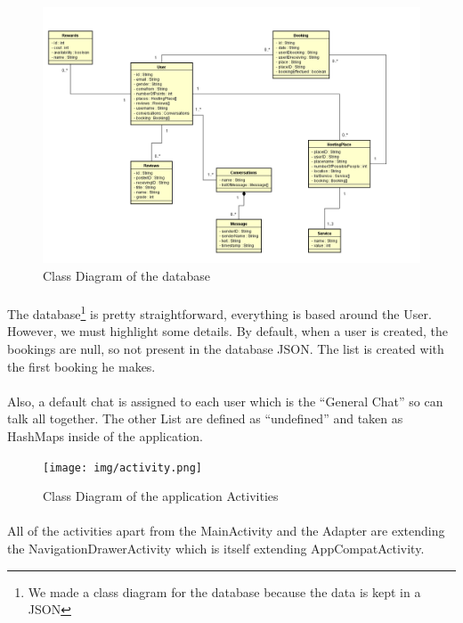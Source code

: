 \documentclass[paper=a4, fontsize=12pt,DIV=14]{scrartcl}    %
\begin{document}
					\begin{figure}[!htbp]
						\center
	                    \includegraphics[scale=0.6]{img/class_diagram.png}
	                    \caption{Class Diagram of the database } 
					\end{figure}

				\paragraph{}The database\footnote{We made a class diagram for the database because the data is kept in a JSON} is pretty straightforward, everything is based around the User. However, we must highlight some details. By default, when a user is created, the bookings are null, so not present in the database JSON. The list is created with the first booking he makes.
				\paragraph{}Also, a default chat is assigned to each user which is the “General Chat” so can talk all together. The other List are defined as “undefined” and taken as HashMaps inside of the application.
				
						\begin{figure}
							\center
		                    \texttt{[image: img/activity.png]}
		                    \caption{Class Diagram of the application Activities } 
						\end{figure}
				\paragraph{}All of the activities apart from the MainActivity and the Adapter are extending the NavigationDrawerActivity which is itself extending AppCompatActivity.
\end{document}
